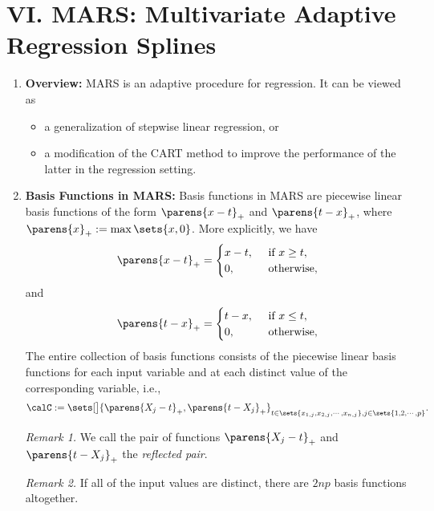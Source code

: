 \documentclass[12pt]{article}
\begin{document}
\section*{VI. MARS: Multivariate Adaptive Regression Splines}

\begin{enumerate}[label=\textbf{\arabic*.}]
	
	\item \textbf{Overview:} MARS is an adaptive procedure for regression. It can be viewed as 
	\begin{itemize}
		\item a generalization of stepwise linear regression, or 
		\item a modification of the CART method to improve the performance of the latter in the regression setting. 
	\end{itemize}
	
	\item \textbf{Basis Functions in MARS:} Basis functions in MARS are piecewise linear basis functions of the form $\parens{x - t}_+$ and $\parens{t - x}_+$, where $\parens{x}_+ := \max \sets{x, 0}$. More explicitly, we have 
	\begin{align*}
		\parens{x - t}_+ = \begin{cases}
			x-t, & \, \text{ if } x \ge t, \\ 
			0, & \, \text{ otherwise}, 
		\end{cases}
	\end{align*}
	and 
	\begin{align*}
		\parens{t - x}_+ = \begin{cases}
			t-x, & \, \text{ if } x \le t, \\ 
			0, & \, \text{ otherwise}, 
		\end{cases}
	\end{align*}
	The entire collection of basis functions consists of the piecewise linear basis functions for each input variable and at each distinct value of the corresponding variable, i.e., 
	\begin{align*}
		\calC := \sets[\big]{\parens{X_j - t}_+, \parens{t - X_j}_+}_{t \in \sets{x_{1,j}, x_{2,j}, \cdots, x_{n,j}}, j \in \sets{1, 2, \cdots, p}}. 
	\end{align*}
	
	\textit{Remark 1.} We call the pair of functions $\parens{X_j - t}_+$ and $\parens{t - X_j}_+$ the \emph{reflected pair}. 
	
	\textit{Remark 2.} If all of the input values are distinct, there are $2np$ basis functions altogether. 
	

\end{enumerate}
\end{document}
